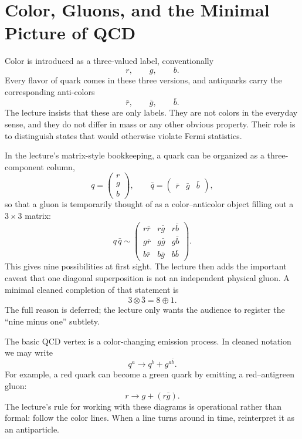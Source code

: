 \section{Color, Gluons, and the Minimal Picture of QCD}

Color is introduced as a three-valued label, conventionally
\[
r,\qquad g,\qquad b.
\]
Every flavor of quark comes in these three versions, and antiquarks carry the corresponding anti-colors
\[
\bar r,\qquad \bar g,\qquad \bar b.
\]
The lecture insists that these are only labels. They are not colors in the everyday sense, and they do not differ in mass or any other obvious property. Their role is to distinguish states that would otherwise violate Fermi statistics.

In the lecture's matrix-style bookkeeping, a quark can be organized as a three-component column,
\begin{equation}
q=
\begin{pmatrix}
r\\
g\\
b
\end{pmatrix},
\qquad
\bar q=
\begin{pmatrix}
\bar r & \bar g & \bar b
\end{pmatrix},
\end{equation}
so that a gluon is temporarily thought of as a color--anticolor object filling out a \(3\times 3\) matrix:
\begin{equation}
q\,\bar q \sim
\begin{pmatrix}
r\bar r & r\bar g & r\bar b\\
g\bar r & g\bar g & g\bar b\\
b\bar r & b\bar g & b\bar b
\end{pmatrix}.
\end{equation}
This gives nine possibilities at first sight. The lecture then adds the important caveat that one diagonal superposition is not an independent physical gluon. A minimal cleaned completion of that statement is
\begin{equation}
3\otimes \bar 3 = 8\oplus 1.
\end{equation}
The full reason is deferred; the lecture only wants the audience to register the ``nine minus one'' subtlety.

The basic QCD vertex is a color-changing emission process. In cleaned notation we may write
\begin{equation}
q^a \longrightarrow q^b + g^{a\bar b}.
\end{equation}
For example, a red quark can become a green quark by emitting a red--antigreen gluon:
\begin{equation}
r \longrightarrow g + (r\bar g).
\end{equation}
The lecture's rule for working with these diagrams is operational rather than formal: follow the color lines. When a line turns around in time, reinterpret it as an antiparticle.

